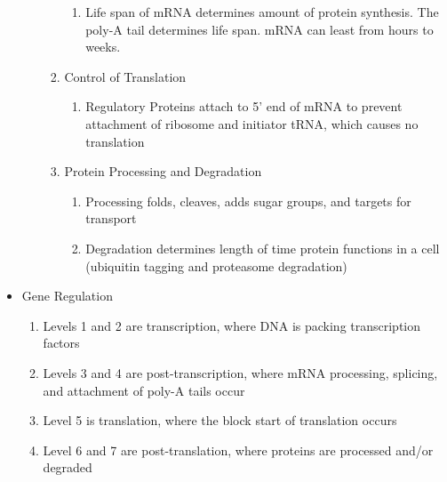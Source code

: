 \documentclass[12pt]{article}
\begin{document}
\begin{itemize}
\begin{enumerate}
\begin{enumerate}
            \begin{enumerate}

              \item Life span of mRNA determines amount of protein synthesis. The poly-A tail determines life span. mRNA can least from hours to weeks.

            \end{enumerate}

          \item Control of Translation

            \begin{enumerate}

              \item Regulatory Proteins attach to 5' end of mRNA to prevent attachment of ribosome and initiator tRNA, which causes no translation

            \end{enumerate}

          \item Protein Processing and Degradation

            \begin{enumerate}

              \item Processing folds, cleaves, adds sugar groups, and targets for transport

              \item Degradation determines length of time protein functions in a cell (ubiquitin tagging and proteasome degradation)

            \end{enumerate}

        \end{enumerate}

    \end{enumerate}

  \item Gene Regulation

    \begin{enumerate}

      \item Levels 1 and 2 are transcription, where DNA is packing transcription factors

      \item Levels 3 and 4 are post-transcription, where mRNA processing, splicing, and attachment of poly-A tails occur

      \item Level 5 is translation, where the block start of translation occurs

      \item Level 6 and 7 are post-translation, where proteins are processed and/or degraded

    \end{enumerate}

\end{itemize}
\end{document}
